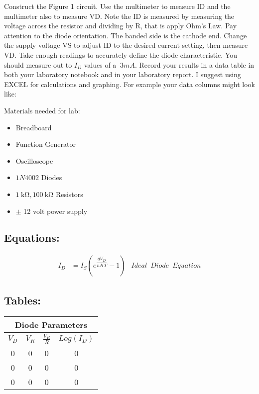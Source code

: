 \documentclass[10pt,a4paper]{article}
\begin{document}
Construct the Figure 1 circuit. Use the multimeter to   measure ID and the multimeter also to measure VD.    Note the ID is  measured by measuring the voltage across the resistor and dividing by R, that is apply Ohm’s Law.    Pay attention to the diode orientation. The banded side is the cathode end.  Change the supply voltage VS to adjust ID to the desired current setting, then measure VD. Take enough readings to accurately define the diode characteristic.   You should measure out to $I_{D}$ values of a $~3mA$.  Record your results in a data table in both your laboratory notebook and in your laboratory report.   I suggest using EXCEL for calculations and graphing.  For example your data columns might look like:


\begin{flushleft}
Materials needed for lab:
\end{flushleft}


\begin{itemize}
\item Breadboard
\item Function Generator 
\item Oscilloscope
\item  $1N4002$ Diodes 
\item  $\SI{1}{\kohm},\SI{100}{\kohm}$ Resistors
\item $\pm$ 12 volt power supply \\

\end{itemize}


\subsection{Equations:}
 
\begin{align}
I_{D} &= I_{S}(e^{\dfrac{qV_{D}}{nKT}}-1) & Ideal \enspace Diode \enspace Equation
\end{align}

\subsection{Tables:}
\begin{center}
\begin{tabular}{|c|c||c|c|}
\hline 
\multicolumn{4}{|c|}{Diode Parameters} \\ 
\hline 
$V_{D}$& $V_{R}$& $\frac{V_{R}}{R}$ & $Log(I_{D})$\\ 
\hline 
0 & 0 & 0 & 0\\ 
\hline 
0 & 0 & 0 & 0 \\ 
\hline 
0 & 0 & 0 & 0\\
\hline 

\end{tabular} 
\end{center}
\end{document}
